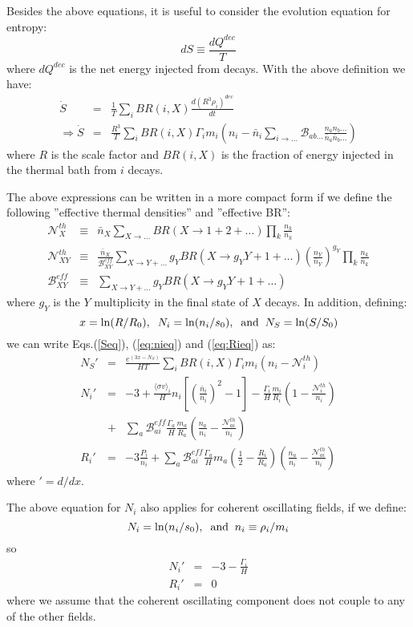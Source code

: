 \documentclass[preprint,notoc]{JHEP3}
\def\to{\rightarrow}
\def\be{\begin{equation}}
\def\ee{\end{equation}}
\def\bea{\begin{eqnarray}}
\def\eea{\end{eqnarray}}
\def\sigv{\langle \sigma v \rangle}
\def\To{\Rightarrow}
\def\to{\rightarrow}
\begin{document}
Besides the above equations, it is useful to consider the evolution equation for entropy:
\be
dS \equiv \frac{dQ^{dec}}{T}
\ee
where $dQ^{dec}$ is the net energy injected from decays.
With the above definition we have:
\bea
\dot{S} & = & \frac{1}{T}\sum_i BR(i,X)
\frac{d\left(R^3 \rho_i\right)^{dec}}{dt}  \nonumber \\
\To \dot{S} & = & \frac{R^3}{T}\sum_i BR(i,X)
\Gamma_i m_i\left(n_i - \bar{n}_i \sum_{i\to\ldots} \mathcal{B}_{ab\ldots} \frac{n_a n_b\ldots}{\bar{n}_a
\bar{n}_b\ldots} \right) \label{Seq}
\eea
where $R$ is the scale factor and $BR(i,X)$ is the fraction of energy injected
in the thermal bath from $i$ decays.
 
 
The above expressions can be written in a more compact form if we define
the following ''effective thermal densities'' and ''effective BR'':
\bea
\mathcal{N}^{th}_{X} & \equiv &  \bar{n}_X \sum_{X \to \ldots} BR(X \to 1 + 2 +
\ldots)
\prod_{k}
\frac{n_k}{\bar{n}_k} \nonumber \\
\mathcal{N}^{th}_{XY} & \equiv & \frac{\bar{n}_X}{\mathcal{B}^{eff}_{XY}}
\sum_{X \to Y + \ldots} g_Y BR(X \to g_Y Y + 1 + \ldots)
\left(\frac{n_Y}{\bar{n}_Y}\right)^{g_Y} \prod_{k} \frac{n_k}{\bar{n}_k}
\nonumber \\
\mathcal{B}^{eff}_{XY} & \equiv & \sum_{X \to Y + \ldots} g_Y BR(X \to g_Y Y +
1+\ldots) \nonumber
\eea
where $g_Y$ is the $Y$ multiplicity in the final state of $X$ decays. 
In addition, defining:
\be
x = \ln(R/R_0),\;\; N_i = \ln(n_i/s_0),\;\; {\rm and}\;\; N_S = \ln(S/S_0)
\ee
we can write Eqs.(\ref{Seq}), (\ref{eq:nieq}) and (\ref{eq:Rieq}) as:
\bea
N_S' & = & \frac{e^{(3 x - N_S)}}{HT} \sum_{i} BR(i,X) \Gamma_i m_i \left(n_i -
\mathcal{N}_{i}^{th} \right) 
\label{Seqb} \\
N_i' & = & -3 + \frac{\sigv_i}{H} n_i [\left(\frac{\bar{n}_i}{n_i}\right)^2
-1] -  \frac{\Gamma_i}{H} \frac{m_i}{R_i}\left(1 -
\frac{\mathcal{N}_{i}^{th}}{n_i} \right) \nonumber  \\
 & + & \sum_{a} \mathcal{B}_{ai}^{eff} \frac{\Gamma_a}{H}
 \frac{m_a}{R_a}\left(\frac{n_a}{n_i} - \frac{\mathcal{N}_{ai}^{th}}{n_i}
  \right)
 \\
R_i' & = &  -3 \frac{P_i}{n_i} + \sum_{a} \mathcal{B}_{ai}^{eff}
\frac{\Gamma_a}{H} m_a \left( \frac{1}{2} - \frac{R_i}{R_a} \right) \left(\frac{n_a}{n_i} -
\frac{\mathcal{N}_{ai}^{th}}{n_i} \right)
\label{Nieq}
\eea
where $'=d/dx$.

The above equation for $N_i$ also applies for coherent oscillating fields, if we define:
\be
N_i = \ln(n_i/s_0),\;\; {\rm and}\;\; n_i \equiv \rho_i/m_i
\ee
so
\bea
N_i' & = & -3 - \frac{\Gamma_i}{H}  \nonumber \\
R_i'& = & 0 \label{Nico}
\eea
where we assume that the coherent oscillating component does not couple to any of the other fields.
\end{document}
